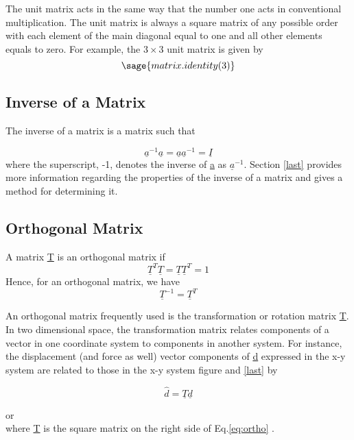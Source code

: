 \documentclass[12pt]{report}
\newcommand{\lab}[1]{
Eq.\ref{#1}
}
\begin{document}
The unit matrix acts in the same way that the number one acts in
conventional multiplication. The unit matrix is always a square matrix
of any possible order with each element of the main diagonal equal to
one and all other elements equals to zero. For example, the $3 \times 3$
unit matrix is given by
\begin{equation}\sage{matrix.identity(3)}\end{equation}

\subsection{Inverse of a Matrix}

The inverse of a matrix is a matrix such that

\begin{equation}\underline{a}^{-1}\underline{a}=\underline{a}\underline{a}^{-1}=\underline{I}\end{equation}
where the superscript, -1, denotes the inverse of \underline{a} as $\underline{a}^{-1}$.
Section \ref{last} provides more information regarding the properties of the
inverse of a matrix and gives a method for determining it.

\subsection{Orthogonal Matrix}
A matrix \underline{T} is an orthogonal matrix if
\begin{equation}\underline{T}^T\underline{T} = \underline{T}\underline{T}^T=1\end{equation}
Hence, for an orthogonal matrix, we have
\begin{equation}\underline{T}^{-1}=\underline{T}^T\end{equation}

An orthogonal matrix frequently used is the transformation or rotation
matrix \underline{T}. In two dimensional space, the transformation matrix
relates components of a vector in one coordinate system to components
in another system. For instance, the displacement (and force as well)
vector components of \underline{d} expressed in the x-y system are related to
those in the x-y system figure and \ref{last} by

\begin{equation}\hat{d}=\underline{T}\underline{d}\end{equation}


or
\begin{equation} \label{eq:ortho}\end{equation}
where \underline{T} is the square matrix on the right side of \lab{eq:ortho}.
\end{document}
